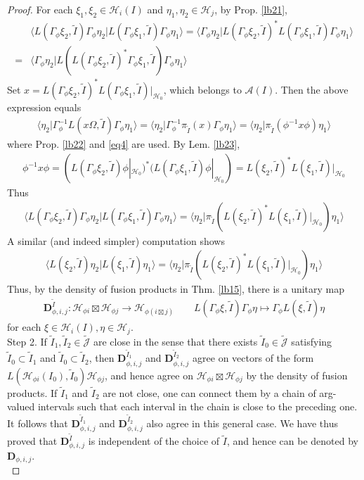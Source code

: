\documentclass[11pt,b5paper,notitlepage]{article}
\theoremstyle{definition}
\theoremstyle{plain}
\newcommand{\wtd}{\widetilde}
\newcommand{\bk}[1]{\langle {#1}\rangle}
\newcommand{\Jtd}{\widetilde{\mathcal J}}
\newcommand{\mbf}{\mathbf}
\newcommand{\MA}{\mathcal A}
\newcommand{\MH}{\mathcal H}
\numberwithin{equation}{section}
\begin{document}
\begin{appendices}
\begin{proof}
For each $\xi_1,\xi_2\in\MH_i(I)$ and $\eta_1,\eta_2\in\MH_j$, by Prop. \ref{lb21},
\begin{align*}
&\bk{L(\Gamma_\phi\xi_2,\wtd I)\Gamma_\phi\eta_2|L(\Gamma_\phi\xi_1,\wtd I)\Gamma_\phi\eta_1}=\bk{\Gamma_\phi\eta_2|L(\Gamma_\phi\xi_2,\wtd I)^*L(\Gamma_\phi\xi_1,\wtd I)\Gamma_\phi\eta_1}\\
=&\bk{\Gamma_\phi\eta_2|L(L(\Gamma_\phi\xi_2,\wtd I)^*\Gamma_\phi\xi_1,\wtd I)\Gamma_\phi\eta_1}
\end{align*}
Set $x=L(\Gamma_\phi\xi_2,\wtd I)^*L(\Gamma_\phi\xi_1,\wtd I)|_{\MH_0}$, which belongs to $\MA(I)$. Then the above expression equals
\begin{align*}
\bk{\eta_2|\Gamma_\phi^{-1}L(x\Omega,\wtd I)\Gamma_\phi\eta_1}=\bk{\eta_2|\Gamma_\phi^{-1}\pi_{\wtd I}(x)\Gamma_\phi\eta_1}=\bk{\eta_2|\pi_{\wtd I}(\phi^{-1}x\phi)\eta_1}
\end{align*}
where Prop. \ref{lb22} and \eqref{eq4} are used. By Lem. \ref{lb23},
\begin{align*}
\phi^{-1}x\phi=(L(\Gamma_\phi\xi_2,\wtd I)\phi|_{\MH_0})^*(L(\Gamma_\phi\xi_1,\wtd I)\phi|_{\MH_0})=L(\xi_2,\wtd I)^*L(\xi_1,\wtd I)|_{\MH_0}
\end{align*}
Thus
\begin{align*}
\bk{L(\Gamma_\phi\xi_2,\wtd I)\Gamma_\phi\eta_2|L(\Gamma_\phi\xi_1,\wtd I)\Gamma_\phi\eta_1}=\bk{\eta_2|\pi_{\wtd I}(L(\xi_2,\wtd I)^*L(\xi_1,\wtd I)|_{\MH_0})\eta_1}
\end{align*}
A similar (and indeed simpler) computation shows
\begin{align*}
\bk{L(\xi_2,\wtd I)\eta_2|L(\xi_1,\wtd I)\eta_1}=\bk{\eta_2|\pi_{\wtd I}(L(\xi_2,\wtd I)^*L(\xi_1,\wtd I)|_{\MH_0})\eta_1}
\end{align*}
Thus, by the density of fusion products in Thm. \ref{lb15}, there is a unitary map
\begin{gather*}
\mbf D^{\wtd I}_{\phi,i,j}:\MH_{\phi i}\boxtimes\MH_{\phi j}\rightarrow \MH_{\phi(i\boxtimes j)}\qquad L(\Gamma_\phi\xi,\wtd I)\Gamma_\phi\eta\mapsto \Gamma_\phi L(\xi,\wtd I)\eta
\end{gather*}
for each $\xi\in\MH_i(I),\eta\in\MH_j$.\\[-1ex]

Step 2. If $\wtd I_1,\wtd I_2\in\Jtd$ are close in the sense that there exists $\wtd I_0\in\Jtd$ satisfying $\wtd I_0\subset\wtd I_1$ and $\wtd I_0\subset\wtd I_2$, then $\mbf D^{\wtd I_1}_{\phi,i,j}$ and $\mbf D^{\wtd I_2}_{\phi,i,j}$ agree on vectors of the form $L(\MH_{\phi i}(I_0),\wtd I_0)\MH_{\phi j}$, and hence agree on $\MH_{\phi i}\boxtimes\MH_{\phi j}$ by the density of fusion products. If $\wtd I_1$ and $\wtd I_2$ are not close, one can connect them by a chain of arg-valued intervals such that each interval in the chain is close to the preceding one. It follows that $\mbf D^{\wtd I_1}_{\phi,i,j}$ and $\mbf D^{\wtd I_2}_{\phi,i,j}$ also agree in this general case. We have thus proved that $\mbf D^{\wtd I}_{\phi,i,j}$ is independent of the choice of $\wtd I$, and hence can be denoted by $\mbf D_{\phi,i,j}$.\\[-1ex]


\end{proof}
\end{appendices}
\end{document}
